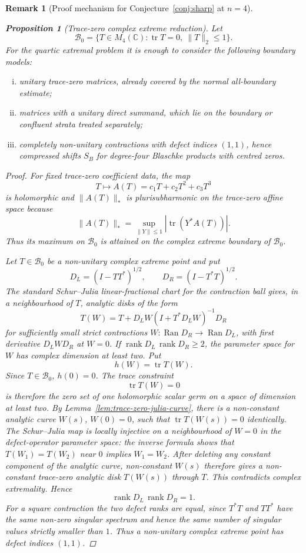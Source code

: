 \documentclass[11pt]{article}
\newtheorem{proposition}[theorem]{Proposition}
\newtheorem{remark}[theorem]{Remark}
\numberwithin{equation}{section}
\newcommand{\bbC}{\mathbb C}
\begin{document}
\begin{remark}[Proof mechanism for Conjecture~\ref{conj:sharp} at $n=4$]
\begin{proposition}[Trace-zero complex extreme reduction]
\label{prop:trace-zero-extreme-reduction}
Let
\[
  \mathcal B_0=\{T\in M_4(\bbC):\operatorname{tr}T=0,\ \|T\|_2\le1\}.
\]
For the quartic extremal problem it is enough to consider the following
boundary models:
\begin{enumerate}[(i)]
\item unitary trace-zero matrices, already covered by the normal all-boundary
estimate;
\item matrices with a unitary direct summand, which lie on the boundary or
confluent strata treated separately;
\item completely non-unitary contractions with defect indices \((1,1)\), hence
compressed shifts \(S_B\) for degree-four Blaschke products with centred zeros.
\end{enumerate}
\end{proposition}

\begin{proof}
For fixed trace-zero coefficient data, the map
\[
  T\longmapsto A(T)=c_1T+c_2T^2+c_3T^3
\]
is holomorphic and \(\|A(T)\|_*\) is plurisubharmonic on the trace-zero affine
space because
\[
  \|A(T)\|_*=\sup_{\|Y\|\le1}|\operatorname{tr}(Y^*A(T))|.
\]
Thus its maximum on \(\mathcal B_0\) is attained on the complex extreme
boundary of \(\mathcal B_0\).

Let \(T\in\mathcal B_0\) be a non-unitary complex extreme point and put
\[
  D_L=(I-TT^*)^{1/2},\qquad D_R=(I-T^*T)^{1/2}.
\]
The standard Schur--Julia linear-fractional chart for the contraction ball
\cite{Halmos1982} gives, in a neighbourhood of \(T\), analytic disks of the form
\[
  T(W)=T+D_LW(I+T^*D_LW)^{-1}D_R
\]
for sufficiently small strict contractions \(W:\operatorname{Ran}D_R\to
\operatorname{Ran}D_L\), with first derivative \(D_LWD_R\) at \(W=0\).
If \(\operatorname{rank}D_L\,\operatorname{rank}D_R\ge2\), the parameter space
for \(W\) has complex dimension at least two.  Put
\[
  h(W)=\operatorname{tr}T(W).
\]
Since \(T\in\mathcal B_0\), \(h(0)=0\).  The trace constraint
\[
  \operatorname{tr}T(W)=0
\]
is therefore the zero set of one holomorphic scalar germ on a space of
dimension at least two.  By Lemma~\ref{lem:trace-zero-julia-curve}, there is a
non-constant analytic curve \(W(s)\), \(W(0)=0\), such that
\(\operatorname{tr}T(W(s))=0\) identically.  The Schur--Julia map is locally
injective on a neighbourhood of \(W=0\) in the defect-operator parameter
space: the inverse formula shows that \(T(W_1)=T(W_2)\) near \(0\) implies
\(W_1=W_2\).  After deleting any constant component of the analytic curve,
non-constant \(W(s)\) therefore gives a non-constant trace-zero analytic disk
\(T(W(s))\) through \(T\).
This contradicts complex extremality.  Hence
\[
  \operatorname{rank}D_L\,\operatorname{rank}D_R=1.
\]
For a square contraction the two defect ranks are equal, since \(T^*T\) and
\(TT^*\) have the same non-zero singular spectrum and hence the same number
of singular values strictly smaller than \(1\).  Thus a non-unitary complex
extreme point has defect indices \((1,1)\).


\end{proof}
\end{remark}
\end{document}
